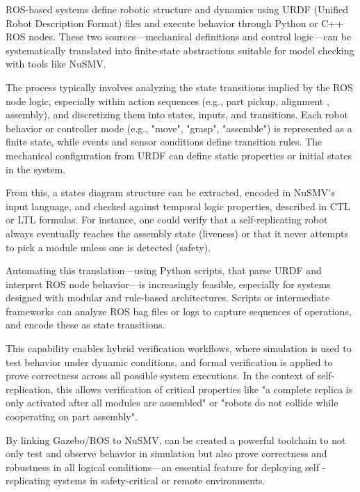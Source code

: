 ROS-based systems define robotic structure and dynamics using URDF (Unified 
Robot Description Format) files and execute behavior through Python or C++ ROS 
nodes. 
These two sources—mechanical definitions and control logic—can be systematically 
translated into finite-state abstractions suitable for model checking with tools 
like NuSMV.

The process typically involves analyzing the state transitions implied by the 
ROS node logic, especially within action sequences (e.g., part pickup, alignment
, assembly), and discretizing them into states, inputs, and transitions. Each 
robot behavior or controller mode (e.g., "move", "grasp", "assemble") is 
represented as a finite state, while events and sensor conditions define transition 
rules. The mechanical configuration from URDF can define static properties or 
initial states in the system.

From this, a states diagram structure can be extracted, encoded 
in NuSMV's input language, and checked against temporal logic properties, described in 
CTL or LTL formulas. 
For instance, one could verify that a self-replicating 
robot always eventually reaches the assembly state (liveness) or that it never 
attempts to pick a module unless one is detected (safety).

Automating this translation—using Python scripts, that parse URDF and interpret ROS node 
behavior—is increasingly feasible, especially for systems designed with modular 
and rule-based architectures. Scripts or intermediate frameworks can analyze 
ROS bag files or logs to capture sequences of operations, and encode these as 
state transitions. 

This capability enables hybrid verification workflows, where simulation is used 
to test behavior under dynamic conditions, and formal verification is applied 
to prove correctness across all possible system executions. In the context of 
self-replication, this allows verification of critical properties like "a complete 
replica is only activated after all modules are assembled" or "robots do not 
collide while cooperating on part assembly".

By linking Gazebo/ROS to NuSMV, can be created a powerful toolchain to not 
only test and observe behavior in simulation but also prove correctness and 
robustness in all logical conditions—an essential feature for deploying self
-replicating systems in safety-critical or remote environments.

